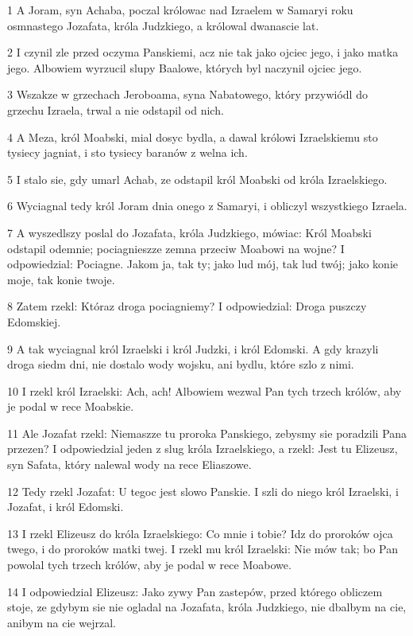 \par 1 A Joram, syn Achaba, poczal królowac nad Izraelem w Samaryi roku osmnastego Jozafata, króla Judzkiego, a królowal dwanascie lat.
\par 2 I czynil zle przed oczyma Panskiemi, acz nie tak jako ojciec jego, i jako matka jego. Albowiem wyrzucil slupy Baalowe, których byl naczynil ojciec jego.
\par 3 Wszakze w grzechach Jeroboama, syna Nabatowego, który przywiódl do grzechu Izraela, trwal a nie odstapil od nich.
\par 4 A Meza, król Moabski, mial dosyc bydla, a dawal królowi Izraelskiemu sto tysiecy jagniat, i sto tysiecy baranów z welna ich.
\par 5 I stalo sie, gdy umarl Achab, ze odstapil król Moabski od króla Izraelskiego.
\par 6 Wyciagnal tedy król Joram dnia onego z Samaryi, i obliczyl wszystkiego Izraela.
\par 7 A wyszedlszy poslal do Jozafata, króla Judzkiego, mówiac: Król Moabski odstapil odemnie; pociagnieszze zemna przeciw Moabowi na wojne? I odpowiedzial: Pociagne. Jakom ja, tak ty; jako lud mój, tak lud twój; jako konie moje, tak konie twoje.
\par 8 Zatem rzekl: Któraz droga pociagniemy? I odpowiedzial: Droga puszczy Edomskiej.
\par 9 A tak wyciagnal król Izraelski i król Judzki, i król Edomski. A gdy krazyli droga siedm dni, nie dostalo wody wojsku, ani bydlu, które szlo z nimi.
\par 10 I rzekl król Izraelski: Ach, ach! Albowiem wezwal Pan tych trzech królów, aby je podal w rece Moabskie.
\par 11 Ale Jozafat rzekl: Niemaszze tu proroka Panskiego, zebysmy sie poradzili Pana przezen? I odpowiedzial jeden z slug króla Izraelskiego, a rzekl: Jest tu Elizeusz, syn Safata, który nalewal wody na rece Eliaszowe.
\par 12 Tedy rzekl Jozafat: U tegoc jest slowo Panskie. I szli do niego król Izraelski, i Jozafat, i król Edomski.
\par 13 I rzekl Elizeusz do króla Izraelskiego: Co mnie i tobie? Idz do proroków ojca twego, i do proroków matki twej. I rzekl mu król Izraelski: Nie mów tak; bo Pan powolal tych trzech królów, aby je podal w rece Moabowe.
\par 14 I odpowiedzial Elizeusz: Jako zywy Pan zastepów, przed którego obliczem stoje, ze gdybym sie nie ogladal na Jozafata, króla Judzkiego, nie dbalbym na cie, anibym na cie wejrzal.
